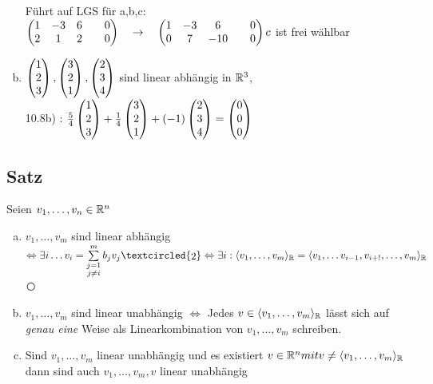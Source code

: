 \begin{enumerate}[a)]
Führt auf LGS für a,b,c:\\
$\begin{pmatrix}
1&-3&6&&0\\
2&1&2&&0
\end{pmatrix}\quad\rightarrow\quad \begin{pmatrix}
1&-3&6&&0\\
0&7&-10&&0
\end{pmatrix}\\
c$ ist frei wählbar
\item $\begin{pmatrix} 1\\2\\3 \end{pmatrix}, \begin{pmatrix} 3\\2\\1 \end{pmatrix}, \begin{pmatrix} 2\\3\\4 \end{pmatrix}$ sind linear abhängig in $\mathbb{R}^3$,\\
10.8b) : $\frac54 \begin{pmatrix} 1\\2\\3 \end{pmatrix} + \frac14 \begin{pmatrix} 3\\2\\1 \end{pmatrix} + (-1)\begin{pmatrix} 2\\3\\4 \end{pmatrix} = \begin{pmatrix} 0\\0\\0 \end{pmatrix}$
\end{enumerate}
\subsection{Satz}\label{sec:0.11}
Seien $v_1,\ldots,v_n \in \mathbb{R}^n$
\begin{enumerate}[a)]
\item $v_1,\ldots,v_m$ sind linear abhängig \textcircled{\raisebox{-1pt}{1}}\\
$\Leftrightarrow \exists i \ldots v_i = \sum\limits^{m}_{\substack{j=1\\j\ne i} }b_jv_j \textcircled{\raisebox{-1pt}{2}} \\\Leftrightarrow \exists i : \langle v_1,\ldots,v_m \rangle_\R = \langle v_1, \ldots v_{i-1}, v_{i+!},\ldots,v_m\rangle_\R$\textcircled{\raisebox{-1pt}{3}}
\item $v_1,\ldots,v_m$ sind linear unabhängig $\Leftrightarrow$ Jedes $v \in \langle v_1,\ldots,v_m\rangle_{\mathbb{R}}$ lässt sich auf \emph{genau eine} Weise als Linearkombination von $v_1,\ldots,v_m$ schreiben.
\item Sind $v_1,\ldots,v_m$ linear unabhängig und es existiert $v \in \mathbb{R}^n mit v \ne \langle v_1,\ldots,v_m\rangle_{\mathbb{R}}$ dann sind auch $v_1,\ldots,v_m,v $ linear unabhängig
\end{enumerate}

